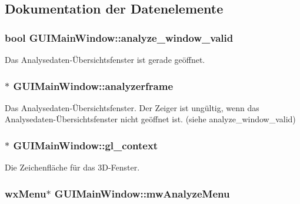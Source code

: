 \subsection{Dokumentation der Datenelemente}
\hypertarget{classGUIMainWindow_a1f65a053fadac47033fef38c4b0e8a69}{
\subsubsection[{analyze\-\_\-window\-\_\-valid}]{\setlength{\rightskip}{0pt plus 5cm}bool G\-U\-I\-Main\-Window\-::analyze\-\_\-window\-\_\-valid\hspace{0.3cm}{\ttfamily [private]}}}\label{classGUIMainWindow_a1f65a053fadac47033fef38c4b0e8a69}
Das Analysedaten-\/Übersichtsfenster ist gerade geöffnet. \hypertarget{classGUIMainWindow_a20e7a8cf498df1c1c0059711b487837b}{
\subsubsection[{analyzerframe}]{$\ast$ G\-U\-I\-Main\-Window\-::analyzerframe\hspace{0.3cm}{\ttfamily [private]}}}\label{classGUIMainWindow_a20e7a8cf498df1c1c0059711b487837b}
Das Analysedaten-\/Übersichtsfenster. Der Zeiger ist ungültig, wenn das Analysedaten-\/Übersichtsfenster nicht geöffnet ist. (siehe analyze\-\_\-window\-\_\-valid) \hypertarget{classGUIMainWindow_a7b5069afb8996ff001654f8d832b2bfa}{
\subsubsection[{gl\-\_\-context}]{$\ast$ G\-U\-I\-Main\-Window\-::gl\-\_\-context\hspace{0.3cm}{\ttfamily [private]}}}\label{classGUIMainWindow_a7b5069afb8996ff001654f8d832b2bfa}
Die Zeichenfläche für das 3\-D-\/\-Fenster. \hypertarget{classGUIMainWindow_ab93a87b5cde10015dc02dc000c409f90}{
\subsubsection[{mw\-Analyze\-Menu}]{\setlength{\rightskip}{0pt plus 5cm}wx\-Menu$\ast$ G\-U\-I\-Main\-Window\-::mw\-Analyze\-Menu\hspace{0.3cm}{\ttfamily [private]}}}\label{classGUIMainWindow_ab93a87b5cde10015dc02dc000c409f90}
